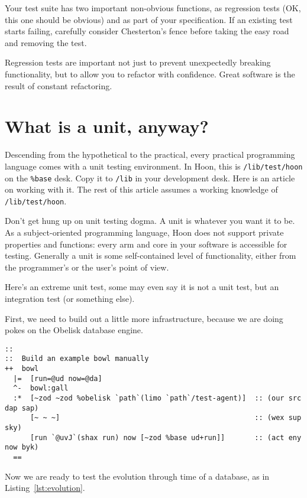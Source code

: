 \documentclass[twoside]{article}
\begin{document}
Your test suite has two important non-obvious functions, as regression tests (OK, this one should be obvious) and as part of your specification. If an existing test starts failing, carefully consider Chesterton's fence \citep{WikipediaChesterton} before taking the easy road and removing the test.

Regression tests are important not just to prevent unexpectedly breaking functionality, but to allow you to refactor with confidence. Great software is the result of constant refactoring.

\section{What is a unit, anyway?}

Descending from the hypothetical to the practical, every practical programming language comes with a unit testing environment. In Hoon, this is \texttt{/lib/test/hoon} on the \texttt{\%base} desk. Copy it to \texttt{/lib} in your development desk. Here is an article on working with it. The rest of this article assumes a working knowledge of \texttt{/lib/test/hoon}.

Don't get hung up on unit testing dogma. A unit is whatever you want it to be. As a subject-oriented programming language, Hoon does not support private properties and functions: every arm and core in your software is accessible for testing. Generally a unit is some self-contained level of functionality, either from the programmer's or the user's point of view.

Here's an extreme unit test, some may even say it is not a unit test, but an integration test (or something else).

First, we need to build out a little more infrastructure, because we are doing pokes on the Obelisk database engine.

\begin{lstlisting}
::
::  Build an example bowl manually
++  bowl
  |=  [run=@ud now=@da]
  ^-  bowl:gall
  :*  [~zod ~zod %obelisk `path`(limo `path`/test-agent)]  :: (our src dap sap)
      [~ ~ ~]                                              :: (wex sup sky)
      [run `@uvJ`(shax run) now [~zod %base ud+run]]       :: (act eny now byk)
  ==
\end{lstlisting}

\noindent
Now we are ready to test the evolution through time of a database, as in Listing~\ref{lst:evolution}.
\end{document}
